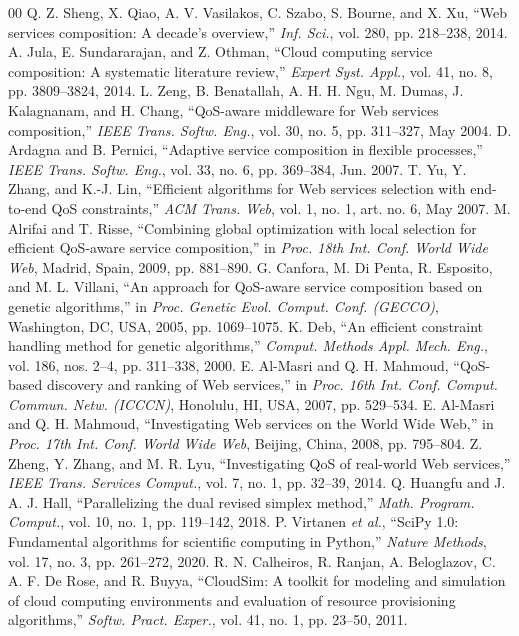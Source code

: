 \documentclass[conference]{IEEEtran}
\begin{document}
\begin{thebibliography}{00}
 Q. Z. Sheng, X. Qiao, A. V. Vasilakos, C. Szabo, S. Bourne, and X. Xu, ``Web services composition: A decade's overview,'' \emph{Inf. Sci.}, vol. 280, pp. 218--238, 2014.
 A. Jula, E. Sundararajan, and Z. Othman, ``Cloud computing service composition: A systematic literature review,'' \emph{Expert Syst. Appl.}, vol. 41, no. 8, pp. 3809--3824, 2014.
 L. Zeng, B. Benatallah, A. H. H. Ngu, M. Dumas, J. Kalagnanam, and H. Chang, ``QoS-aware middleware for Web services composition,'' \emph{IEEE Trans. Softw. Eng.}, vol. 30, no. 5, pp. 311--327, May 2004.
 D. Ardagna and B. Pernici, ``Adaptive service composition in flexible processes,'' \emph{IEEE Trans. Softw. Eng.}, vol. 33, no. 6, pp. 369--384, Jun. 2007.
 T. Yu, Y. Zhang, and K.-J. Lin, ``Efficient algorithms for Web services selection with end-to-end QoS constraints,'' \emph{ACM Trans. Web}, vol. 1, no. 1, art. no. 6, May 2007.
 M. Alrifai and T. Risse, ``Combining global optimization with local selection for efficient QoS-aware service composition,'' in \emph{Proc. 18th Int. Conf. World Wide Web}, Madrid, Spain, 2009, pp. 881--890.
 G. Canfora, M. Di Penta, R. Esposito, and M. L. Villani, ``An approach for QoS-aware service composition based on genetic algorithms,'' in \emph{Proc. Genetic Evol. Comput. Conf. (GECCO)}, Washington, DC, USA, 2005, pp. 1069--1075.
 K. Deb, ``An efficient constraint handling method for genetic algorithms,'' \emph{Comput. Methods Appl. Mech. Eng.}, vol. 186, nos. 2--4, pp. 311--338, 2000.
 E. Al-Masri and Q. H. Mahmoud, ``QoS-based discovery and ranking of Web services,'' in \emph{Proc. 16th Int. Conf. Comput. Commun. Netw. (ICCCN)}, Honolulu, HI, USA, 2007, pp. 529--534.
 E. Al-Masri and Q. H. Mahmoud, ``Investigating Web services on the World Wide Web,'' in \emph{Proc. 17th Int. Conf. World Wide Web}, Beijing, China, 2008, pp. 795--804.
 Z. Zheng, Y. Zhang, and M. R. Lyu, ``Investigating QoS of real-world Web services,'' \emph{IEEE Trans. Services Comput.}, vol. 7, no. 1, pp. 32--39, 2014.
 Q. Huangfu and J. A. J. Hall, ``Parallelizing the dual revised simplex method,'' \emph{Math. Program. Comput.}, vol. 10, no. 1, pp. 119--142, 2018.
 P. Virtanen \emph{et al.}, ``SciPy 1.0: Fundamental algorithms for scientific computing in Python,'' \emph{Nature Methods}, vol. 17, no. 3, pp. 261--272, 2020.
 R. N. Calheiros, R. Ranjan, A. Beloglazov, C. A. F. De Rose, and R. Buyya, ``CloudSim: A toolkit for modeling and simulation of cloud computing environments and evaluation of resource provisioning algorithms,'' \emph{Softw. Pract. Exper.}, vol. 41, no. 1, pp. 23--50, 2011.
\end{thebibliography}
\end{document}
